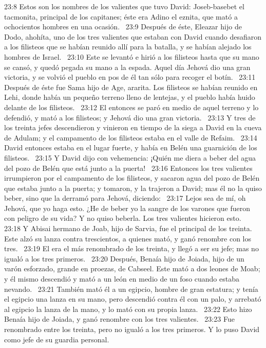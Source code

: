 23:8 Estos son los nombres de los valientes que tuvo David: Joseb-basebet el tacmonita, principal de los capitanes; éste era Adino el eznita, que mató a ochocientos hombres en una ocasión.  
23:9 Después de éste, Eleazar hijo de Dodo, ahohíta, uno de los tres valientes que estaban con David cuando desafiaron a los filisteos que se habían reunido allí para la batalla, y se habían alejado los hombres de Israel.  
23:10 Este se levantó e hirió a los filisteos hasta que su mano se cansó, y quedó pegada su mano a la espada. Aquel día Jehová dio una gran victoria, y se volvió el pueblo en pos de él tan sólo para recoger el botín.  
23:11 Después de éste fue Sama hijo de Age, ararita. Los filisteos se habían reunido en Lehi, donde había un pequeño terreno lleno de lentejas, y el pueblo había huido delante de los filisteos.  
23:12 El entonces se paró en medio de aquel terreno y lo defendió, y mató a los filisteos; y Jehová dio una gran victoria.  
23:13 Y tres de los treinta jefes descendieron y vinieron en tiempo de la siega a David en la cueva de Adulam; y el campamento de los filisteos estaba en el valle de Refaim.  
23:14 David entonces estaba en el lugar fuerte, y había en Belén una guarnición de los filisteos.  
23:15 Y David dijo con vehemencia: ¡Quién me diera a beber del agua del pozo de Belén que está junto a la puerta!  
23:16 Entonces los tres valientes irrumpieron por el campamento de los filisteos, y sacaron agua del pozo de Belén que estaba junto a la puerta; y tomaron, y la trajeron a David; mas él no la quiso beber, sino que la derramó para Jehová, diciendo:  
23:17 Lejos sea de mí, oh Jehová, que yo haga esto. ¿He de beber yo la sangre de los varones que fueron con peligro de su vida? Y no quiso beberla. Los tres valientes hicieron esto.  
23:18 Y Abisai hermano de Joab, hijo de Sarvia, fue el principal de los treinta. Este alzó su lanza contra trescientos, a quienes mató, y ganó renombre con los tres.  
23:19 El era el más renombrado de los treinta, y llegó a ser su jefe; mas no igualó a los tres primeros.  
23:20 Después, Benaía hijo de Joiada, hijo de un varón esforzado, grande en proezas, de Cabseel. Este mató a dos leones de Moab; y él mismo descendió y mató a un león en medio de un foso cuando estaba nevando.  
23:21 También mató él a un egipcio, hombre de gran estatura; y tenía el egipcio una lanza en su mano, pero descendió contra él con un palo, y arrebató al egipcio la lanza de la mano, y lo mató con su propia lanza.  
23:22 Esto hizo Benaía hijo de Joiada, y ganó renombre con los tres valientes.  
23:23 Fue renombrado entre los treinta, pero no igualó a los tres primeros. Y lo puso David como jefe de su guardia personal. 
